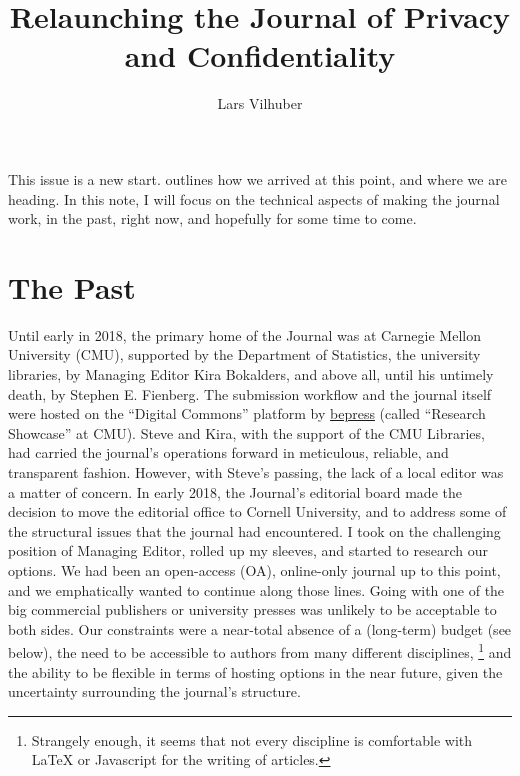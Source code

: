 \documentclass{jpcfinal} %
\begin{document}
\title[Relaunching JPC]{Relaunching the Journal of Privacy and Confidentiality}

\author{Lars Vilhuber}	%
\address{Managing Editor, Journal of Privacy and Confidentiality\newline 
Department of Economics, Cornell University}	%

\maketitle

This issue is a new start. \cite{DworkEditorial} outlines how we arrived at this point, and where we are heading. In this note, I will focus on the technical aspects of making the journal work, in the past, right  now, and hopefully for some time to come. 
\section{The Past}

Until early in 2018, the primary home of the Journal was at Carnegie Mellon University (CMU), supported by the Department of Statistics, the university libraries, by  Managing Editor Kira Bokalders, and above all, until his untimely death,  by Stephen E. Fienberg. The submission workflow and the journal itself were hosted on the ``Digital Commons'' platform by \href{https://www.bepress.com}{bepress} (called ``Research Showcase'' at CMU). Steve and Kira, with the support of the CMU Libraries, had carried the journal's operations forward in meticulous, reliable, and transparent fashion. However, with Steve's passing, the lack of a local editor was a matter of concern. In early 2018, the Journal's editorial board made the decision to move the editorial office to Cornell University, and to address some of the structural issues that the journal had encountered. I took on the challenging position of Managing Editor, rolled up my sleeves, and started to research our options. We had been an open-access (OA), online-only journal up to this point, and we emphatically wanted to continue along those lines. Going with one of the big commercial publishers or university presses was unlikely to be acceptable to both sides.  Our constraints were a near-total absence of a (long-term) budget (see below),  the need to be accessible to authors from many different disciplines,%
\footnote{Strangely enough, it seems that   not every discipline is comfortable with \LaTeX{} or Javascript for the writing of articles.}
and the ability to be flexible in terms of hosting options in the near future, given the uncertainty surrounding the journal's structure.
\end{document}
